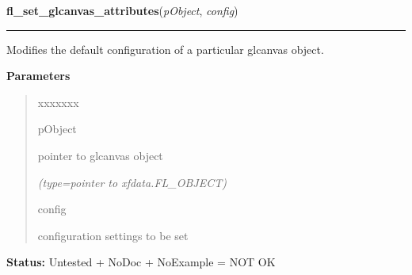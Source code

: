 \hspace{.8\funcindent}\begin{boxedminipage}{\funcwidth}

    \raggedright \textbf{fl\_set\_glcanvas\_attributes}(\textit{pObject}, \textit{config})

    \vspace{-1.5ex}

    \rule{\textwidth}{0.5\fboxrule}
\setlength{\parskip}{2ex}
    Modifies the default configuration of a particular glcanvas object.

\setlength{\parskip}{1ex}
      \textbf{Parameters}
      \vspace{-1ex}

      \begin{quote}
        \begin{Ventry}{xxxxxxx}

          \item[pObject]

          pointer to glcanvas object

            {\it (type=pointer to xfdata.FL\_OBJECT)}

          \item[config]

          configuration settings to be set

        \end{Ventry}

      \end{quote}

\textbf{Status:} Untested + NoDoc + NoExample = NOT OK



    \end{boxedminipage}

    \label{xformslib:library:fl_get_glcanvas_attributes}

    \vspace{0.5ex}

